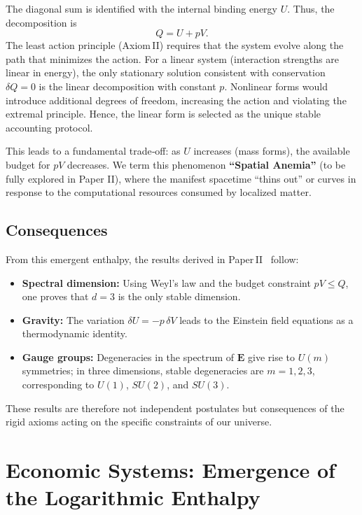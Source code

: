 \documentclass{article}
\begin{document}
The diagonal sum is identified with the internal binding energy $U$. Thus, the decomposition is
\[
Q = U + pV.
\]
The least action principle (Axiom II) requires that the system evolve along the path that minimizes the action. For a linear system (interaction strengths are linear in energy), the only stationary solution consistent with conservation $\delta Q = 0$ is the linear decomposition with constant $p$. Nonlinear forms would introduce additional degrees of freedom, increasing the action and violating the extremal principle. Hence, the linear form is selected as the unique stable accounting protocol.

This leads to a fundamental trade‑off: as $U$ increases (mass forms), the available budget for $pV$ decreases. We term this phenomenon \textbf{“Spatial Anemia”} (to be fully explored in Paper II), where the manifest spacetime “thins out” or curves in response to the computational resources consumed by localized matter.

\subsection{Consequences}
From this emergent enthalpy, the results derived in Paper II~\cite{paperII} follow:
\begin{itemize}
    \item \textbf{Spectral dimension:} Using Weyl’s law and the budget constraint $pV \le Q$, one proves that $d=3$ is the only stable dimension.
    \item \textbf{Gravity:} The variation $\delta U = -p\,\delta V$ leads to the Einstein field equations as a thermodynamic identity.
    \item \textbf{Gauge groups:} Degeneracies in the spectrum of $\mathbf{E}$ give rise to $U(m)$ symmetries; in three dimensions, stable degeneracies are $m=1,2,3$, corresponding to $U(1)$, $SU(2)$, and $SU(3)$.
\end{itemize}
These results are therefore not independent postulates but consequences of the rigid axioms acting on the specific constraints of our universe.

\section{Economic Systems: Emergence of the Logarithmic Enthalpy}
\end{document}
